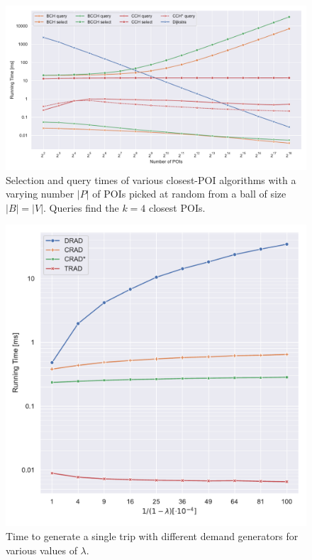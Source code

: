 \documentclass[manuscript,review]{acmart}
\begin{document}
\begin{figure}
\centering
\includegraphics[width=\linewidth]{fig/knn_num_pois.pdf}
\caption{
Selection and query times of various closest-POI algorithms with a varying number $|P|$ of POIs picked at random from a ball of size $|B| = |V|$.
Queries find the $k = 4$ closest POIs.
}\label{fig:knn_num_pois}
\end{figure}

\begin{figure}
\centering
\includegraphics[width=.6363\linewidth]{fig/knn_demands.pdf}
\caption{
Time to generate a single trip with different demand generators for various values of $\lambda$.
}\label{fig:knn_demands}
\end{figure}
\end{document}
